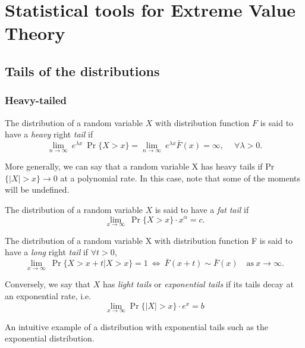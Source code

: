 \thispagestyle{empty}

\chapter{Statistical tools for Extreme Value Theory}\label{appA}

\section{Tails of the distributions}\label{app:tails}


\subsection*{Heavy-tailed} 

\begin{definition}
The distribution of a random variable $X$ with distribution function $F$ is said 
to have a \emph{heavy} right \emph{tail} if 
\begin{equation}
\displaystyle{\lim_{n \to \infty}} \ e^{\lambda x} \ \Pr\{X>x\}=\displaystyle{\lim_{n 
\to \infty}} \ e^{\lambda x} \bar{F}(x)=\infty , \ \quad \forall \lambda>0.
\end{equation}
\end{definition}
More generally, we can say that a random variable X has heavy tails if Pr$\{|X|>x\}\to 0$ at 
a polynomial rate. In this case, note that some of the moments will be undefined.

\begin{definition}
The distribution of a random variable $X$ is said to have a \emph{fat} \emph{tail} if
\begin{equation}
\displaystyle{\lim_{x \to \infty}} \ \Pr\{ X > x \}\cdot x^{\alpha} = c.
\end{equation}
\end{definition}


\begin{definition}
The distribution of a random variable X with distribution function F is said to have a \emph{long} 
right \emph{tail} if $\forall t > 0$,
\begin{equation}
\displaystyle{\lim_{x \to \infty}} \ \Pr\{X>x+t|X>x\}=1 \ \Leftrightarrow \ 
\bar{F}(x+t)\sim\bar{F}(x) \quad \text{as} \ x\to\infty.
\end{equation}
\end{definition}


\begin{definition}
Conversely, we say that $X$ has \emph{light tails} or \emph{exponential tails} if its tails decay at an exponential rate, i.e. 
\begin{equation}
\displaystyle{\lim_{x \to \infty}} \Pr\{|X|>x\} \cdot  e^x=b
\end{equation}
\end{definition}
An intuitive example of a distribution with exponential tails such as the exponential distribution.


